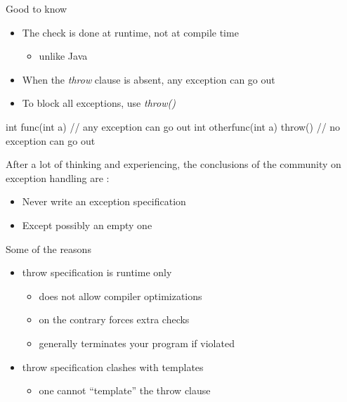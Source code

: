 \begin{frame}[fragile]
  \begin{block}{Good to know}
    \begin{itemize}
    \item The check is done at runtime, not at compile time
      \begin{itemize}
      \item unlike Java
      \end{itemize}
    \item When the {\it throw} clause is absent, any exception can go out
    \item To block all exceptions, use {\it throw()}
    \end{itemize}
  \end{block}
  \pause
  \begin{cppcode}
    int func(int a) {
      // any exception can go out
    }
    int otherfunc(int a) throw() {
      // no exception can go out
    }
  \end{cppcode}
\end{frame}

\begin{frame}[fragile]
  \begin{block}{}
    After a lot of thinking and experiencing, the conclusions of the community on exception handling are :
    \begin{itemize}
    \item Never write an exception specification
    \item Except possibly an empty one
    \end{itemize}
  \end{block}
  \pause
  \begin{alertblock}{Some of the reasons}
    \begin{itemize}
    \item throw specification is runtime only
      \begin{itemize}
      \item does not allow compiler optimizations
      \item on the contrary forces extra checks
      \item generally terminates your program if violated
      \end{itemize}
    \item throw specification clashes with templates
      \begin{itemize}
      \item one cannot ``template'' the throw clause
      \end{itemize}
    \end{itemize}
  \end{alertblock}
\end{frame}

